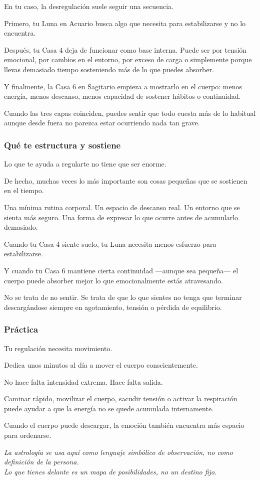 \documentclass[11pt,a4paper]{article}
\begin{document}
En tu caso, la desregulación suele seguir una secuencia.

Primero, tu Luna en Acuario busca algo que necesita para estabilizarse y no lo encuentra.

Después, tu Casa 4 deja de funcionar como base interna. Puede ser por tensión emocional, por cambios en el entorno, por exceso de carga o simplemente porque llevas demasiado tiempo sosteniendo más de lo que puedes absorber.

Y finalmente, la Casa 6 en Sagitario empieza a mostrarlo en el cuerpo:
menos energía,
menos descanso,
menos capacidad de sostener hábitos o continuidad.

Cuando las tres capas coinciden, puedes sentir que todo cuesta más de lo habitual aunque desde fuera no parezca estar ocurriendo nada tan grave.

\subsubsection*{Qué te estructura y sostiene}

Lo que te ayuda a regularte no tiene que ser enorme.

De hecho, muchas veces lo más importante son cosas pequeñas que se sostienen en el tiempo.

Una mínima rutina corporal.
Un espacio de descanso real.
Un entorno que se sienta más seguro.
Una forma de expresar lo que ocurre antes de acumularlo demasiado.

Cuando tu Casa 4 siente suelo, tu Luna necesita menos esfuerzo para estabilizarse.

Y cuando tu Casa 6 mantiene cierta continuidad —aunque sea pequeña— el cuerpo puede absorber mejor lo que emocionalmente estás atravesando.

No se trata de no sentir.
Se trata de que lo que sientes no tenga que terminar descargándose siempre en agotamiento, tensión o pérdida de equilibrio.

\subsubsection*{Práctica}

Tu regulación necesita movimiento.

Dedica unos minutos al día a mover el cuerpo conscientemente.

No hace falta intensidad extrema. Hace falta salida.

Caminar rápido, movilizar el cuerpo, sacudir tensión o activar la respiración puede ayudar a que la energía no se quede acumulada internamente.

Cuando el cuerpo puede descargar, la emoción también encuentra más espacio para ordenarse.

\vspace{0.6cm}

\begin{center}
{\small\itshape\color{grisai}
La astrología se usa aquí como lenguaje simbólico de observación, no como definición de la persona.\\
Lo que tienes delante es un mapa de posibilidades, no un destino fijo.
}
\end{center}
\end{document}
